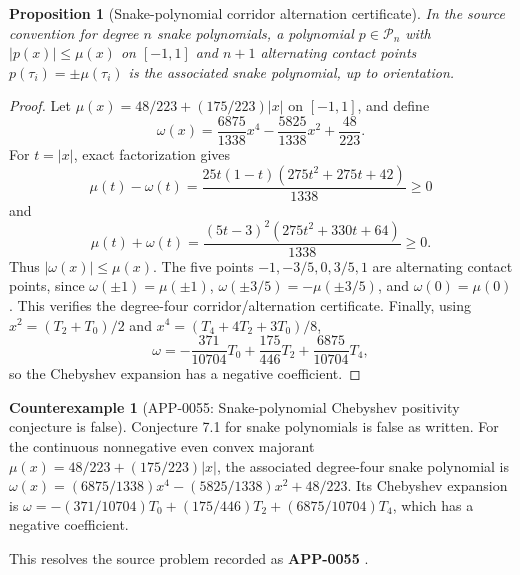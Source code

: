 \documentclass[11pt]{article}
\numberwithin{equation}{section}
\newtheorem{proposition}[theorem]{Proposition}
\theoremstyle{definition}
\newtheorem{counterexample}[theorem]{Counterexample}
\theoremstyle{remark}
\newcommand{\1}{\mathbf 1}
\begin{document}
\begin{proposition}[Snake-polynomial corridor alternation certificate]
\label{res:snakepolynomial-corridor-alternation-certificate}
In the source convention for degree \(n\) snake polynomials, a polynomial \(p\in\mathcal P_n\) with \(|p(x)|\le\mu(x)\) on \([-1,1]\) and \(n+1\) alternating contact points \(p(\tau_i)=\pm\mu(\tau_i)\) is the associated snake polynomial, up to orientation.
\end{proposition}

\begin{proof}
Let \(\mu(x)=48/223+(175/223)|x|\) on \([-1,1]\), and define
\[
\omega(x)=\frac{6875}{1338}x^4-\frac{5825}{1338}x^2+\frac{48}{223}.
\]
For \(t=|x|\), exact factorization gives
\[
\mu(t)-\omega(t)=\frac{25t(1-t)(275t^2+275t+42)}{1338}\ge0
\]
and
\[
\mu(t)+\omega(t)=\frac{(5t-3)^2(275t^2+330t+64)}{1338}\ge0.
\]
Thus \(|\omega(x)|\le\mu(x)\). The five points \(-1,-3/5,0,3/5,1\) are alternating contact points, since \(\omega(\pm1)=\mu(\pm1)\), \(\omega(\pm3/5)=-\mu(\pm3/5)\), and \(\omega(0)=\mu(0)\). This verifies the degree-four corridor/alternation certificate. Finally, using \(x^2=(T_2+T_0)/2\) and \(x^4=(T_4+4T_2+3T_0)/8\),
\[
\omega=-\frac{371}{10704}T_0+\frac{175}{446}T_2+\frac{6875}{10704}T_4,
\]
so the Chebyshev expansion has a negative coefficient.
\end{proof}

\begin{counterexample}[APP-0055: Snake-polynomial Chebyshev positivity conjecture is false]
\label{res:not-snakepolynomial-chebyshev-convexmajorant-conjecture7-1}
Conjecture 7.1 for snake polynomials is false as written. For the continuous nonnegative even convex majorant \(\mu(x)=48/223+(175/223)|x|\), the associated degree-four snake polynomial is \(\omega(x)=(6875/1338)x^4-(5825/1338)x^2+48/223\). Its Chebyshev expansion is \(\omega=-(371/10704)T_0+(175/446)T_2+(6875/10704)T_4\), which has a negative coefficient.



This resolves the source problem recorded as \textbf{APP-0055} \cite{app-app-0055-source}.
\end{counterexample}
\end{document}

